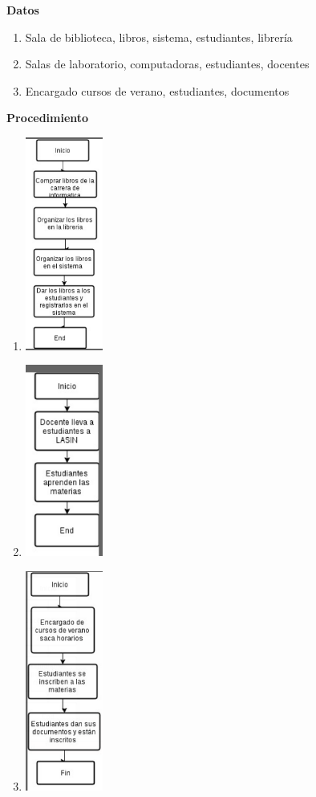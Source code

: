 \textbf{Datos}
\begin{enumerate}
\item  Sala de biblioteca, libros, sistema, estudiantes, librería
\item  Salas de laboratorio, computadoras, estudiantes, docentes
\item  Encargado cursos de verano, estudiantes, documentos
\end{enumerate}
\textbf{Procedimiento}
\begin{enumerate}
\item \includegraphics[width=0.2\textwidth]{img/3-a.png}
\item \includegraphics[width=0.2\textwidth]{img/3-b.png}
\item \includegraphics[width=0.2\textwidth]{img/3-c.png}
\end{enumerate}
  
